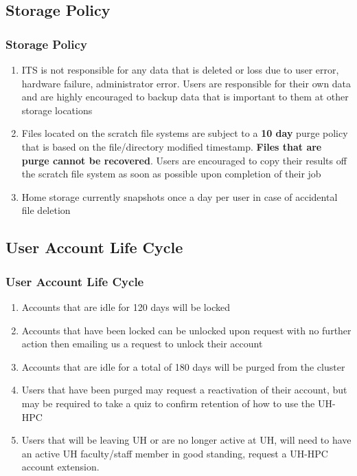 \subsection{Storage Policy}
\begin{frame}
\frametitle{Storage Policy}
\begin{enumerate}
\item ITS is not responsible for any data that is deleted or loss due to user error, hardware failure, administrator error.  Users are responsible for their own data and are highly encouraged to backup data that is important to them at other storage locations
\item Files located on the scratch file systems are subject to a \textbf{10 day} purge policy that is based on the file/directory modified timestamp.  \textbf{Files that are purge cannot be recovered}.  Users are encouraged to copy their results off the scratch file system as soon as possible upon completion of their job
\item  Home storage currently snapshots once a day per user in case of accidental file deletion
\end{enumerate}
\end{frame}


\subsection{User Account Life Cycle}
\begin{frame}
\frametitle{User Account Life Cycle}
\begin{enumerate}
\item Accounts that are idle for 120 days will be locked
\item Accounts that have been locked can be unlocked upon request with no further action then emailing us a request to unlock their account
\item Accounts that are idle for a total of 180 days will be purged from the cluster
\item Users that have been purged may request a reactivation of their account, but may be required to take a quiz to confirm retention of how to use the UH-HPC
\item Users that will be leaving UH or are no longer active at UH, will need to have an active UH faculty/staff member in good standing, request a UH-HPC account extension.
\end{enumerate}
\end{frame}


